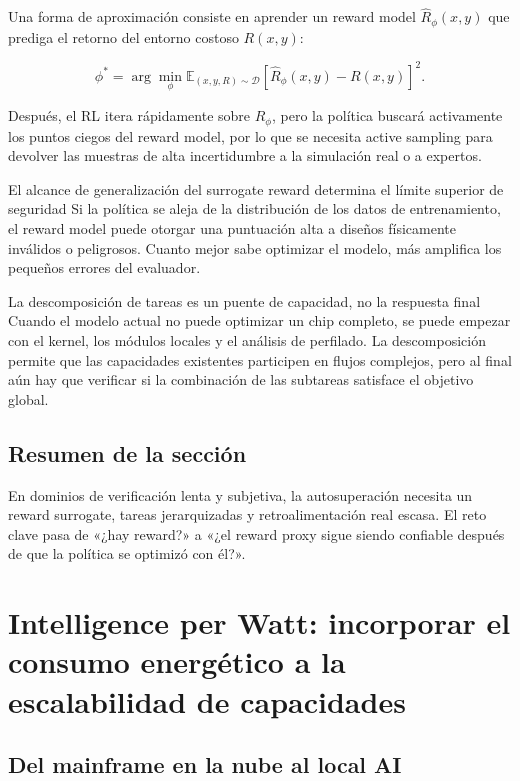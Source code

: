 \documentclass[a4paper]{article}
\begin{document}
Una forma de aproximación consiste en aprender un reward model $\hat R_\phi(x,y)$ que prediga el retorno del entorno costoso $R(x,y)$:

$$
\phi^*=\arg\min_\phi
\mathbb E_{(x,y,R)\sim \mathcal D}
\left[\hat R_\phi(x,y)-R(x,y)\right]^2.
$$

Después, el RL itera rápidamente sobre $\hat R_\phi$, pero la política buscará activamente los puntos ciegos del reward model, por lo que se necesita active sampling para devolver las muestras de alta incertidumbre a la simulación real o a expertos.

\begin{warningbox}{El alcance de generalización del surrogate reward determina el límite superior de seguridad}
Si la política se aleja de la distribución de los datos de entrenamiento, el reward model puede otorgar una puntuación alta a diseños físicamente inválidos o peligrosos. Cuanto mejor sabe optimizar el modelo, más amplifica los pequeños errores del evaluador.
\end{warningbox}

\begin{knowledgebox}{La descomposición de tareas es un puente de capacidad, no la respuesta final}
Cuando el modelo actual no puede optimizar un chip completo, se puede empezar con el kernel, los módulos locales y el análisis de perfilado. La descomposición permite que las capacidades existentes participen en flujos complejos, pero al final aún hay que verificar si la combinación de las subtareas satisface el objetivo global.
\end{knowledgebox}

\subsection{Resumen de la sección}

En dominios de verificación lenta y subjetiva, la autosuperación necesita un reward surrogate, tareas jerarquizadas y retroalimentación real escasa. El reto clave pasa de «¿hay reward?» a «¿el reward proxy sigue siendo confiable después de que la política se optimizó con él?».
\section{Intelligence per Watt: incorporar el consumo energético a la escalabilidad de capacidades}

\subsection{Del mainframe en la nube al local AI}
\end{document}
